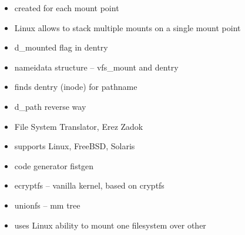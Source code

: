 \documentclass[30pt,a4paper,landscape,headrule,footrule]{foils}
\begin{document}
\begin{itemize}
\item created for each mount point
\item Linux allows to stack multiple mounts on a single mount point
\item d\_mounted flag in dentry         
\end{itemize}

\begin{itemize}
\item nameidata structure -- vfs\_mount and dentry
\item finds dentry (inode) for pathname         
\item d\_path reverse way 
\end{itemize}

\begin{itemize}
\item File System Translator, Erez Zadok
\item supports Linux, FreeBSD, Solaris
\item code generator fistgen
\item ecryptfs -- vanilla kernel, based on cryptfs 
\item unionfs -- mm tree
\item uses Linux ability to mount one filesystem over other
\end{itemize}

\end{document}
